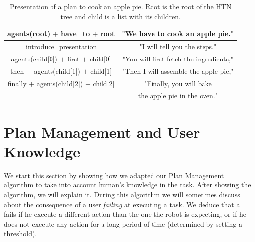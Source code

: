  \begin{table}
\centering
\scriptsize
\renewcommand{\arraystretch}{1.3}
\begin{tabular}{c|c}
   agents(root) $+$ have\_to $+$ root  & "We have to cook an apple pie." \\
   \hline
   introduce\_presentation & "I will tell you the steps." \\
   \hline
   agents(child[0]) $+$ first $+$ child[0] & "You will first fetch the ingredients," \\
   \hline
   then $+$ agents(child[1]) $+$  child[1] & "Then I will assemble the apple pie," \\
   \hline
   finally $+$ agents(child[2]) $+$  child[2] & "Finally, you will bake \\
   & the apple pie in the oven." \\
\end{tabular}
\caption[Presentation of a plan to cook an apple pie]{Presentation of a plan to cook an apple pie. Root is the root of the HTN tree and child is a list with its children.}
 \label{table:knowledge-pie-present}    
\end{table}


\section{Plan Management and User Knowledge}
\label{sec:knowledge-plan_management}
We start this section by showing how we adapted our Plan Management algorithm to take into account human's knowledge in the task. After showing the algorithm, we will explain it. During this algorithm we will sometimes discuss about the consequence of a user \textit{failing} at executing a task. We deduce that a fails if he execute a different action than the one the robot is expecting, or if he does not execute any action for a long period of time (determined by setting a threshold).


